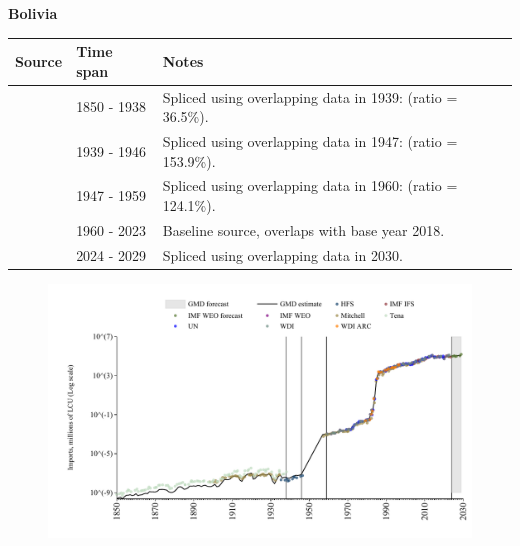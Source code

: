 \documentclass[12pt,a4paper,landscape]{article}
\begin{document}
\begin{adjustbox}{max totalsize={\paperwidth}{\paperheight},center}
\begin{minipage}[t][\textheight][t]{\textwidth}
\vspace*{0.5cm}
{}
\begin{center}
{\Large\bfseries Bolivia}
\end{center}
\vspace{0.5cm}
\begin{table}[H]
\centering
\small
\begin{tabular}{|l|l|l|}
\hline
\textbf{Source} & \textbf{Time span} & \textbf{Notes} \\
\hline
\rowcolor{white}\cite{Tena}& 1850 - 1938 &Spliced using overlapping data in 1939: (ratio = 36.5\%).\\
\rowcolor{lightgray}\cite{HFS}& 1939 - 1946 &Spliced using overlapping data in 1947: (ratio = 153.9\%).\\
\rowcolor{white}\cite{Mitchell}& 1947 - 1959 &Spliced using overlapping data in 1960: (ratio = 124.1\%).\\
\rowcolor{lightgray}\cite{WDI}& 1960 - 2023 &Baseline source, overlaps with base year 2018.\\
\rowcolor{white}\cite{IMF_WEO_forecast}& 2024 - 2029 &Spliced using overlapping data in 2030.\\
\hline
\end{tabular}
\end{table}
\begin{figure}[H]
\centering
\includegraphics[width=\textwidth,height=0.6\textheight,keepaspectratio]{graphs/BOL_imports.pdf}
\end{figure}
\end{minipage}
\end{adjustbox}
\end{document}
